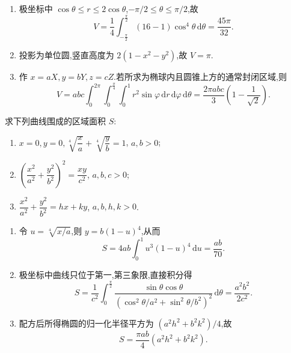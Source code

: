 \begin{solution}
    \leavevmode
    \begin{enumerate}
        \item 极坐标中 $\cos\theta\leq r\leq2\cos\theta$,$-\pi/2\leq\theta\leq\pi/2$,故
              \[
                  V=\dfrac{1}{4}\int_{-\frac{\pi}{2}}^{\frac{\pi}{2}}\left(16-1\right)\cos^4\theta\,\mathrm{d}\theta
                  =\dfrac{45\pi}{32}.
              \]
        \item 投影为单位圆,竖直高度为 $2(1-x^2-y^2)$,故 $V=\pi$.
        \item 作 $x=aX,y=bY,z=cZ$.若所求为椭球内且圆锥上方的通常封闭区域,则
              \[
                  V=abc\int_0^{2\pi}\!\int_0^{\frac{\pi}{4}}\!\int_0^1r^2\sin\varphi\,\mathrm{d}r\,\mathrm{d}\varphi\,\mathrm{d}\theta
                  =\dfrac{2\pi abc}{3}\left(1-\dfrac{1}{\sqrt{2}}\right).
              \]
    \end{enumerate}
\end{solution}

\begin{example}
    求下列曲线围成的区域面积 $S$:
    \begin{enumerate}
        \item $x=0,y=0,\sqrt[4]{\dfrac{x}{a}}+\sqrt[4]{\dfrac{y}{b}}=1$, $a,b>0$;
        \item $\left(\dfrac{x^2}{a^2}+\dfrac{y^2}{b^2}\right)^2=\dfrac{xy}{c^2}$, $a,b,c>0$;
        \item $\dfrac{x^2}{a^2}+\dfrac{y^2}{b^2}=hx+ky$, $a,b,h,k>0$.
    \end{enumerate}
\end{example}
\exampleblank

\begin{solution}
    \leavevmode
    \begin{enumerate}
        \item 令 $u=\sqrt[4]{x/a}$,则 $y=b(1-u)^4$,从而
              \[
                  S=4ab\int_0^1u^3(1-u)^4\,\mathrm{d}u=\dfrac{ab}{70}.
              \]
        \item 极坐标中曲线只位于第一,第三象限,直接积分得
              \[
                  S=\dfrac{1}{c^2}\int_0^{\frac{\pi}{2}}
                  \dfrac{\sin\theta\cos\theta}{(\cos^2\theta/a^2+\sin^2\theta/b^2)^2}\,\mathrm{d}\theta
                  =\dfrac{a^2b^2}{2c^2}.
              \]
        \item 配方后所得椭圆的归一化半径平方为 $(a^2h^2+b^2k^2)/4$,故
              \[
                  S=\dfrac{\pi ab}{4}(a^2h^2+b^2k^2).
              \]
    \end{enumerate}
\end{solution}

